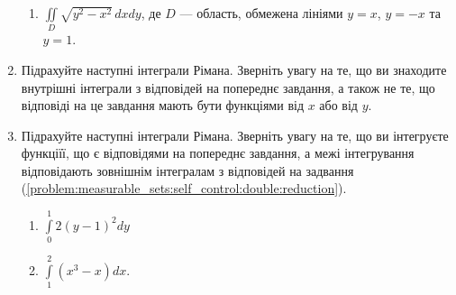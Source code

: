 \begin{enumerate}
\begin{enumerate}[label*=\arabic*.]
    \item $\iint\limits_D \sqrt{y^{2}-x^{2}} \, d x d y$, де $D$ --- область, обмежена лініями ${y = x}$, ${y = -x}$ та ${y = 1}$.
\end{enumerate}
\item\label{problem:measurable_sets:self_control:double:inner} Підрахуйте наступні інтеграли Рімана. Зверніть увагу на те, що ви знаходите внутрішні інтеграли з відповідей на попереднє завдання, а також не те, що відповіді на це завдання мають бути функціями від $x$ або від $y$.
\begin{enumerate}[label*=\arabic*.]
\end{enumerate}
\item\label{problem:measurable_sets:self_control:double:outer} Підрахуйте наступні інтеграли Рімана. Зверніть увагу на те, що ви інтегруєте функціїї, що є відповідями на попереднє завдання, а межі інтегрування відповідають зовнішнім інтегралам з відповідей на задвання (\ref{problem:measurable_sets:self_control:double:reduction}).
\par\noindent
\begin{minipage}{14.5cm}
\begin{enumerate}[label*=\arabic*.]
            \item ${\int\limits_{0}^{1}2 \left(y-1\right)^{2}d y}$
            \item ${\int\limits_{1}^{2}\left(x^{3}-x\right)d x}$.

\end{enumerate}
\end{minipage}
\end{enumerate}
